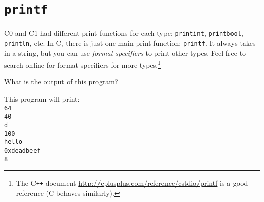\section*{\lstinline'printf'%
}

\enlargethispage{5ex}
C0 and C1 had different print functions for each type:
\lstinline'printint', \lstinline'printbool', \lstinline'println', etc.
In C, there is just one main print function:
\lstinline'printf'. It always takes in a string,
but you can use \emph{format specifiers} to print other types.
Feel free to search online for format specifiers for more types.\footnote{The C\texttt{++} document
  \url{http://cplusplus.com/reference/cstdio/printf} is a good
  reference (C behaves similarly).}

\checkpoint*{}
\bgroup
\smalllistings

\egroup

What is the output of this program?

\begin{solution}
This program will print:\\
\lstinline'64'\\
\lstinline'40'\\
\lstinline'd'\\
\lstinline'100'\\
\lstinline'hello'\\
\lstinline'0xdeadbeef'\\
\lstinline'8'\\
\end{solution}
